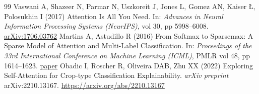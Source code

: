 \documentclass[journal]{IEEEtran}
\begin{document}
\begin{thebibliography}{99}
Vaswani A, Shazeer N, Parmar N, Uszkoreit J, Jones L, Gomez AN, Kaiser \L{}, Polosukhin I (2017) Attention Is All You Need. In: \textit{Advances in Neural Information Processing Systems (NeurIPS)}, vol 30, pp 5998--6008. \href{https://arxiv.org/abs/1706.03762}{arXiv:1706.03762}
Martins A, Astudillo R (2016) From Softmax to Sparsemax: A Sparse Model of Attention and Multi-Label Classification. In: \textit{Proceedings of the 33rd International Conference on Machine Learning (ICML)}, PMLR vol 48, pp 1614--1623. \href{https://proceedings.mlr.press/v48/martins16.html}{paper}
Obadic I, Roscher R, Oliveira DAB, Zhu XX (2022) Exploring Self-Attention for Crop-type Classification Explainability. \textit{arXiv preprint} arXiv:2210.13167. \href{https://arxiv.org/abs/2210.13167}{https://arxiv.org/abs/2210.13167}
\end{thebibliography}
\end{document}
